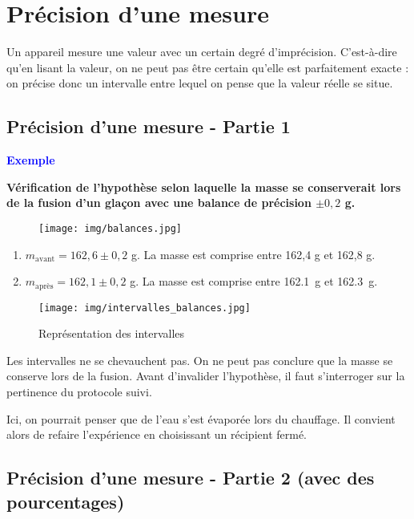 \documentclass[a4paper,12pt]{article}
\begin{document}
\section{Précision d'une mesure}

Un appareil mesure une valeur avec un certain degré d'imprécision. C'est-à-dire qu'en lisant la valeur, on ne peut pas être certain qu'elle est parfaitement exacte : on précise donc un intervalle entre lequel on pense que la valeur réelle se situe. 

\subsection{Précision d'une mesure - Partie 1}

\textcolor{blue}{\textbf{Exemple}} 
\vspace{1em}

\textbf{Vérification de l’hypothèse selon laquelle la masse se conserverait lors de la fusion d’un glaçon avec une balance de précision $\pm 0,2$ g.}

\begin{figure}[H]
  \centering
  \texttt{[image: img/balances.jpg]}
\end{figure}

\begin{enumerate}[noitemsep]
    \item $m_{\text{avant}} = 162,6 \pm 0,2$ g. La masse est comprise entre 162,4 g et 162,8 g.
    \item $m_{\text{après}} = 162,1 \pm 0,2$ g. La masse est comprise entre \SI{162,1}{g} et \SI{162,3}{g}.
\end{enumerate}


\begin{figure}[H]
  \centering
  \texttt{[image: img/intervalles\_balances.jpg]}
  \caption{Représentation des intervalles}
\end{figure}

Les intervalles ne se chevauchent pas. On ne peut pas conclure que la masse se conserve lors de la fusion.
Avant d'invalider l'hypothèse, il faut s'interroger sur la pertinence du protocole suivi.

\vspace{1em}

Ici, on pourrait penser que de l'eau s'est évaporée lors du chauffage. Il convient alors de refaire l'expérience en choisissant un récipient fermé.

\subsection{Précision d'une mesure - Partie 2 (avec des pourcentages)}
\end{document}
